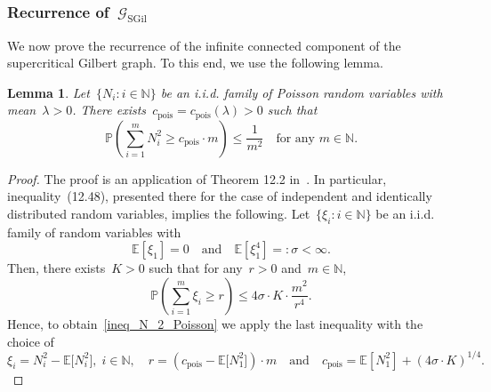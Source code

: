 \documentclass[a4paper,11pt]{article}
\newcommand{\EE}{\mathbb{E}}
\newcommand{\PP}{\mathbb{P}}
\newcommand{\NN}{\mathbb{N}}
\newtheorem{lemma}{Lemma}
\theoremstyle{definition}
\begin{document}
\subsubsection{Recurrence of~$\mathcal G_\mathrm{SGil}$}\label{ss_recurrence_SGil}
We now prove the recurrence of the infinite connected component of the supercritical Gilbert graph. To this end, we use the following lemma.
 
\begin{lemma}\label{lem:billingsley}
Let~$\{N_i: i \in \NN\}$ be an i.i.d. family of Poisson random variables with mean~$\lambda > 0$. There exists~$c_\mathrm{pois} = c_\mathrm{pois}(\lambda) > 0$ such that 
\begin{equation}\label{ineq_N_2_Poisson}
\mathbb P \left( \sum^m_{i=1}N^2_i \ge c_\mathrm{pois} \cdot m \right) \leq \frac{1}{m^2} \quad \text{for any } m \in \NN.
\end{equation}
\end{lemma}
\begin{proof}
The proof is an application of Theorem 12.2 in~\cite{Billingsley68}. In particular, inequality~(12.48), presented there for the case of independent and identically distributed random variables, implies the following. Let~$\{\xi_i: i \in \NN\}$ be an i.i.d. family of random variables with
$$  \EE[\xi_1] = 0 \quad \text{and} \quad \EE[\xi^4_1] =: \sigma < \infty.$$
Then, there exists~$K> 0$ such that for any~$r > 0$ and~$m \in \NN$,
$$ \PP \left( \sum^m_{i=1} \xi_i \ge r \right) \leq 4 \sigma \cdot K \cdot \frac{m^2}{r^4}.$$
Hence, to obtain~\eqref{ineq_N_2_Poisson} we apply the last inequality with the choice of
$$ \xi_i = N^2_i - \EE \big[N^2_i \big], \; i \in \NN, \quad r = (c_\mathrm{pois} - \EE \big[N^2_1 \big]) \cdot m \quad \text{and} \quad c_\mathrm{pois} = \EE[N^2_1] + (4 \sigma \cdot K)^{1/4}. $$
\end{proof}
\end{document}
